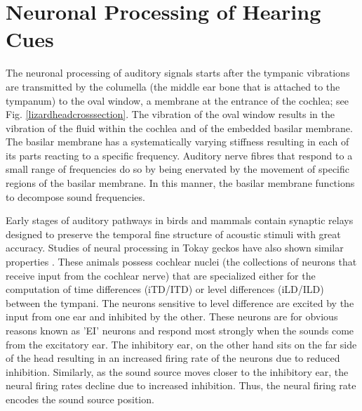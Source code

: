 \section{Neuronal Processing of Hearing Cues}\label{iceneuro}
The neuronal processing of auditory signals starts after the tympanic vibrations are transmitted by the columella (the middle ear bone that is attached to the tympanum)
to the oval window, a membrane at the entrance of the cochlea; see Fig. \ref{lizardheadcrosssection}. The vibration of the oval window results in the vibration of
the fluid within the cochlea and of the embedded basilar membrane. The basilar membrane has a systematically varying stiffness resulting in each of its parts 
reacting to a specific frequency. Auditory nerve fibres that respond to a small range of frequencies do so by being enervated by the movement of specific
regions of the basilar membrane. In this manner, the basilar membrane functions to decompose sound frequencies.

Early stages of auditory pathways in birds and mammals contain synaptic relays designed to preserve the temporal fine structure of 
acoustic stimuli with great accuracy.  Studies of neural processing in Tokay geckos have also shown similar properties \cite{dalsgaardtangcarr}.
These animals possess cochlear nuclei (the collections of neurons that receive input from the cochlear nerve) that are specialized either for
the computation of time differences (iTD/ITD) or level differences (iLD/ILD) between the tympani. The neurons sensitive to level difference are excited by the 
input from one ear and inhibited by the other. These neurons are for obvious reasons known as 'EI' neurons and respond most strongly when the
sounds come from the excitatory ear. The inhibitory ear, on the other hand sits on the far side of the head resulting in an increased firing
rate of the neurons due to reduced inhibition. Similarly, as the sound source moves closer to the inhibitory ear, the neural firing rates decline
due to increased inhibition. Thus, the neural firing rate encodes the sound source position. 

